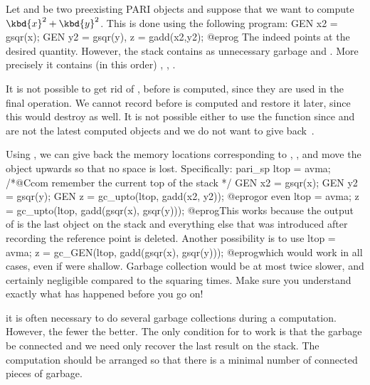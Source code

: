 
Let  and  be two preexisting PARI objects and suppose that we
want to compute $\kbd{x}^2 + \kbd{y}^2$. This is done using the following
program:
\bprog
  GEN x2 = gsqr(x);
  GEN y2 = gsqr(y), z = gadd(x2,y2);
@eprog\noindent
The   indeed points at the desired quantity. However,
the stack contains as unnecessary garbage  and .
More precisely it contains (in this order) , , .

It is not possible to get rid of ,  before  is
computed, since they are used in the final operation. We cannot record
 before  is computed and restore it later, since this would
destroy  as well. It is not possible either to use the function
 since  and  are not the latest computed objects
and we do not want to give back~.

Using , we can give back the memory locations
corresponding to , , and move the object  upwards so
that no space is lost. Specifically:
\bprog
  pari_sp ltop = avma;  /*@Ccom remember the current top of the stack */
  GEN x2 = gsqr(x);
  GEN y2 = gsqr(y);
  GEN z = gc_upto(ltop, gadd(x2, y2));
@eprog\noindent or even
\bprog
  ltop = avma;
  z = gc_upto(ltop, gadd(gsqr(x), gsqr(y)));
@eprog\noindent This works because the output of  is the last
object on the stack and everything else that was introduced after recording
the  reference point is deleted. Another possibility is to use
\bprog
  ltop = avma;
  z = gc_GEN(ltop, gadd(gsqr(x), gsqr(y)));
@eprog\noindent which would work in all cases, even if  were
shallow. Garbage collection would be at most twice slower, and certainly
negligible compared to the squaring times. Make sure you understand exactly
what has happened before you go on!

 it is often necessary to do
several garbage collections during a computation. However, the fewer the
better. The only condition for  to work is that the
garbage be connected and we need only recover the last result on the stack.
The computation should be arranged so that there is a minimal number of
connected pieces of garbage.

